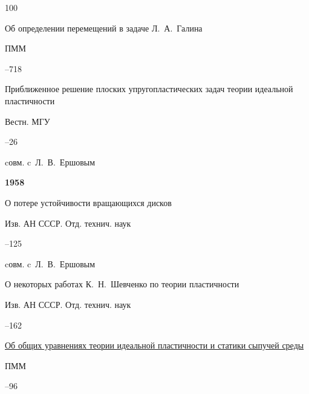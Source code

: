 \begin{thebibliography}{100}

\paper Об определении перемещений в задаче Л.~А.~Галина 

\jour ПММ




–718




\paper Приближенное решение плоских упругопластических задач теории идеальной пластичности 

\jour Вестн. МГУ



–26 

\miscnote cовм. c~Л.~В.~Ершовым 





\item[] \centerline{\bf 1958}




\paper О потере устойчивости вращающихся дисков 

\jour Изв. АН СССР. Отд. технич. наук



–125 

\miscnote cовм. c~Л.~В.~Ершовым 




\paper О некоторых работах К.~Н.~Шевченко по теории пластичности 

\jour Изв. АН СССР. Отд. технич. наук



–162




\paper \href{https://zbmath.org/?q=an:0097.39901}{Об общих уравнениях теории идеальной пластичности и статики сыпучей среды}

\jour ПММ




–96



\end{thebibliography}
